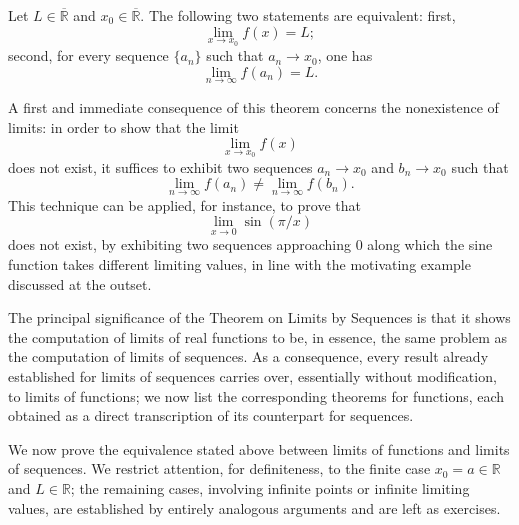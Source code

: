\begin{theorem}
Let $L \in \overline{\mathbb{R}}$ and $x_0 \in \overline{\mathbb{R}}$. The following two statements are equivalent: first, \[
\lim_{x \to x_0} f(x) = L;
\] second, for every sequence $\{a_n\}$ such that $a_n \to x_0$, one has
\[
\lim_{n \to \infty} f(a_n) = L.
\]

\end{theorem}

A first and immediate consequence of this theorem concerns the nonexistence of limits: in order to show that the limit \[
\lim_{x \to x_0} f(x)
\] does not exist, it suffices to exhibit two sequences $a_n \to x_0$ and $b_n \to x_0$ such that
\[
\lim_{n \to \infty} f(a_n) \neq \lim_{n \to \infty} f(b_n).
\]
This technique can be applied, for instance, to prove that \[
\lim_{x \to 0} \sin(\pi/x)
\] does not exist, by exhibiting two sequences approaching $0$ along which the sine function takes different limiting values, in line with the motivating example discussed at the outset.

The principal significance of the Theorem on Limits by Sequences is that it shows the computation of limits of real functions to be, in essence, the same problem as the computation of limits of sequences. As a consequence, every result already established for limits of sequences carries over, essentially without modification, to limits of functions; we now list the corresponding theorems for functions, each obtained as a direct transcription of its counterpart for sequences.

We now prove the equivalence stated above between limits of functions and limits of sequences. We restrict attention, for definiteness, to the finite case $x_0 = a \in \mathbb{R}$ and $L \in \mathbb{R}$; the remaining cases, involving infinite points or infinite limiting values, are established by entirely analogous arguments and are left as exercises.

